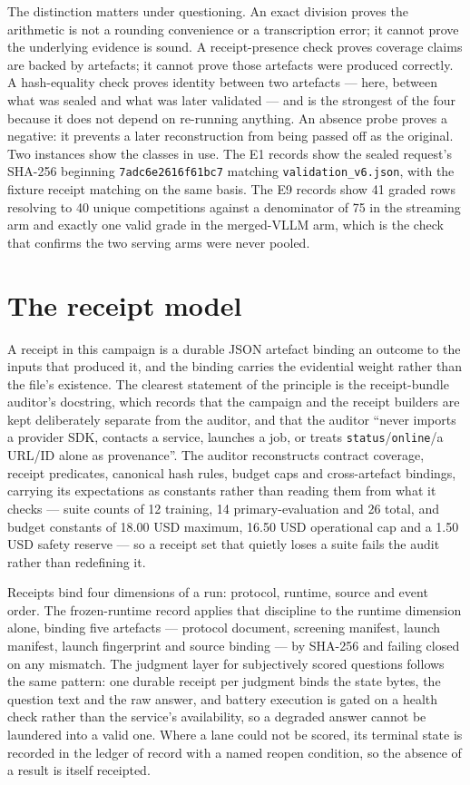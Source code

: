 \documentclass[12pt,a4paper]{report}
\begin{document}
The distinction matters under questioning. An exact division proves the
arithmetic is not a rounding convenience or a transcription error; it
cannot prove the underlying evidence is sound. A receipt-presence check
proves coverage claims are backed by artefacts; it cannot prove those
artefacts were produced correctly. A hash-equality check proves identity
between two artefacts --- here, between what was sealed and what was
later validated --- and is the strongest of the four because it does not
depend on re-running anything. An absence probe proves a negative: it
prevents a later reconstruction from being passed off as the original.
Two instances show the classes in use. The E1 records show the sealed
request's SHA-256 beginning \texttt{7adc6e2616f61bc7} matching
\texttt{validation\_v6.json}, with the fixture receipt matching on the
same basis. The E9 records show 41 graded rows resolving to 40 unique
competitions against a denominator of 75 in the streaming arm and
exactly one valid grade in the merged-VLLM arm, which is the check that
confirms the two serving arms were never pooled.

\section{The receipt model}\label{the-receipt-model}

A receipt in this campaign is a durable JSON artefact binding an outcome
to the inputs that produced it, and the binding carries the evidential
weight rather than the file's existence. The clearest statement of the
principle is the receipt-bundle auditor's docstring, which records that
the campaign and the receipt builders are kept deliberately separate
from the auditor, and that the auditor ``never imports a provider SDK,
contacts a service, launches a job, or treats
\texttt{status}/\texttt{online}/a URL/ID alone as provenance''. The
auditor reconstructs contract coverage, receipt predicates, canonical
hash rules, budget caps and cross-artefact bindings, carrying its
expectations as constants rather than reading them from what it checks
--- suite counts of 12 training, 14 primary-evaluation and 26 total, and
budget constants of 18.00 USD maximum, 16.50 USD operational cap and a
1.50 USD safety reserve --- so a receipt set that quietly loses a suite
fails the audit rather than redefining it.

Receipts bind four dimensions of a run: protocol, runtime, source and
event order. The frozen-runtime record applies that discipline to the
runtime dimension alone, binding five artefacts --- protocol document,
screening manifest, launch manifest, launch fingerprint and source
binding --- by SHA-256 and failing closed on any mismatch. The judgment
layer for subjectively scored questions follows the same pattern: one
durable receipt per judgment binds the state bytes, the question text
and the raw answer, and battery execution is gated on a health check
rather than the service's availability, so a degraded answer cannot be
laundered into a valid one. Where a lane could not be scored, its
terminal state is recorded in the ledger of record with a named reopen
condition, so the absence of a result is itself receipted.
\end{document}
